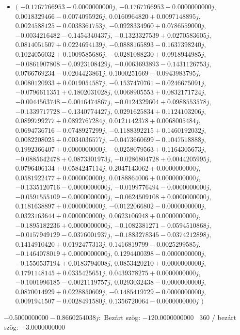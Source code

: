 \documentclass[14pt,a4paper]{article}
\begin{document}
\begin{itemize}
\item
$\big($
$-0.1767766953-0.0000000000j$, $-0.1767766953-0.0000000000j$, $0.0018329466-0.0074095926j$, $0.0160964820+0.0097148895j$, $0.0024588125-0.0038361753j$, $-0.0928334960+0.0786559000j$, $-0.0034216482-0.1454340437j$, $-0.1323327539+0.0270583605j$, $0.0814051507+0.0224694139j$, $-0.0888165893-0.1637398240j$, $0.1024056032+0.1009585686j$, $-0.0281088230+0.0918944985j$, $-0.0861907808-0.0923108429j$, $-0.0063693893-0.1431126753j$, $0.0766769234-0.0204423861j$, $0.1000251669-0.0943983795j$, $0.0080120933+0.0019054587j$, $-0.1537470761-0.0246675091j$, $-0.0796611351+0.1802031028j$, $0.0068905553+0.0832171724j$, $-0.0044563748-0.0016474867j$, $-0.0124329604+0.0988553578j$, $-0.1339717728-0.1340774427j$, $0.0291625834+0.1124103206j$, $0.0899799277+0.0892767284j$, $0.0121142378+0.0068005484j$, $0.0694736716-0.0748927299j$, $-0.1188392215+0.1460192032j$, $0.0082208025+0.0034036577j$, $-0.0473660699-0.1047518888j$, $0.1992366407+0.0000000000j$, $-0.0258079563+0.1164305673j$, $-0.0885642478+0.0873301973j$, $-0.0286804728+0.0044205995j$, $0.0796406134+0.0584247114j$, $0.2047143062+0.0000000000j$, $0.0581922477+0.0000000000j$, $0.0188864006+0.0000000000j$, $-0.1335120716-0.0000000000j$, $-0.0199776494-0.0000000000j$, $-0.0591555109-0.0000000000j$, $-0.0624509108+0.0000000000j$, $0.1181638897+0.0000000000j$, $-0.0122066802-0.0000000000j$, $0.0323163644+0.0000000000j$, $0.0623106948+0.0000000000j$, $-0.1895182236+0.0000000000j$, $-0.1082381271-0.0594510868j$, $-0.0157949129-0.0376001937j$, $-0.1883278345-0.0374212898j$, $0.1414910420+0.0192477313j$, $0.1416819799-0.0025299585j$, $-0.1464078019+0.0000000000j$, $0.1294400398-0.0000000000j$, $-0.1550537194+0.0183794008j$, $0.0853420210+0.0000000000j$, $0.1791148145+0.0335425651j$, $0.0439378275+0.0000000000j$, $-0.1001996185-0.0021119757j$, $0.0293032438-0.0000000000j$, $0.0870014929+0.0228850609j$, $-0.1485419729-0.0000000000j$, $0.0091941507-0.0028491580j$, $0.1356720064-0.0000000000j$
$\big)$
\end{itemize}
$-0.5000000000-0.8660254038j$:\
Bezárt szög: $-120.0000000000$ \
360 / bezárt szög: $-3.0000000000$\
\end{document}
